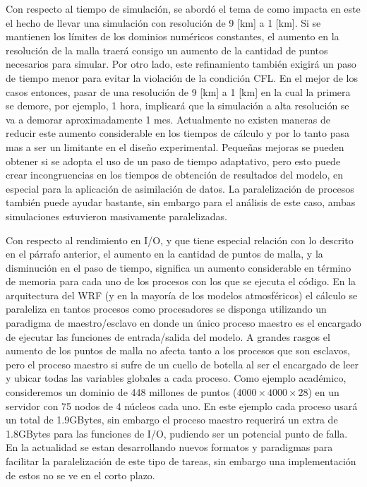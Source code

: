 Con respecto al tiempo de simulación, se abordó el tema de como impacta en este el hecho de llevar una simulación con resolución de 9 [km] a 1 [km]. Si se mantienen los límites de los dominios numéricos constantes, el aumento en la resolución de la malla traerá consigo un aumento de la cantidad de puntos necesarios para simular. Por otro lado, este refinamiento también exigirá un paso de tiempo menor para evitar la violación de la condición CFL. En el mejor de los casos entonces, pasar de una resolución de 9 [km] a 1 [km] en la cual la primera se demore, por ejemplo, 1 hora, implicará que la simulación a alta resolución se va a demorar aproximadamente 1 mes. Actualmente no existen maneras de reducir este aumento considerable en los tiempos de cálculo y por lo tanto pasa mas a ser un limitante en el diseño experimental. Pequeñas mejoras se pueden obtener si se adopta el uso de un paso de tiempo adaptativo, pero esto puede crear incongruencias en los tiempos de obtención de resultados del modelo, en especial para la aplicación de asimilación de datos. La paralelización de procesos también puede ayudar bastante, sin embargo para el análisis de este caso, ambas simulaciones estuvieron masivamente paralelizadas.

Con respecto al rendimiento en I/O, y que tiene especial relación con lo descrito en el párrafo anterior, el aumento en la cantidad de puntos de malla, y la disminución en el paso de tiempo, significa un aumento considerable en término de memoria para cada uno de los procesos con los que se ejecuta el código. En la arquitectura del WRF (y en la mayoría de los modelos atmosféricos) el cálculo se paraleliza en tantos procesos como procesadores se disponga utilizando un paradigma de maestro/esclavo en donde un único proceso maestro es el encargado de ejecutar las funciones de entrada/salida del modelo. A grandes rasgos el aumento de los puntos de malla no afecta tanto a los procesos que son esclavos, pero el proceso maestro si sufre de un cuello de botella al ser el encargado de leer y ubicar todas las variables globales a cada proceso. Como ejemplo académico, consideremos un dominio de 448 millones de puntos ($4000\times4000\times28$) en un servidor con 75 nodos de 4 núcleos cada uno. En este ejemplo cada proceso usará un total de 1.9GBytes, sin embargo el proceso maestro requerirá un extra de 1.8GBytes para las funciones de I/O, pudiendo ser un potencial punto de falla. En la actualidad se estan desarrollando nuevos formatos y paradigmas para facilitar la paralelización de este tipo de tareas, sin embargo una implementación de estos no se ve en el corto plazo.

